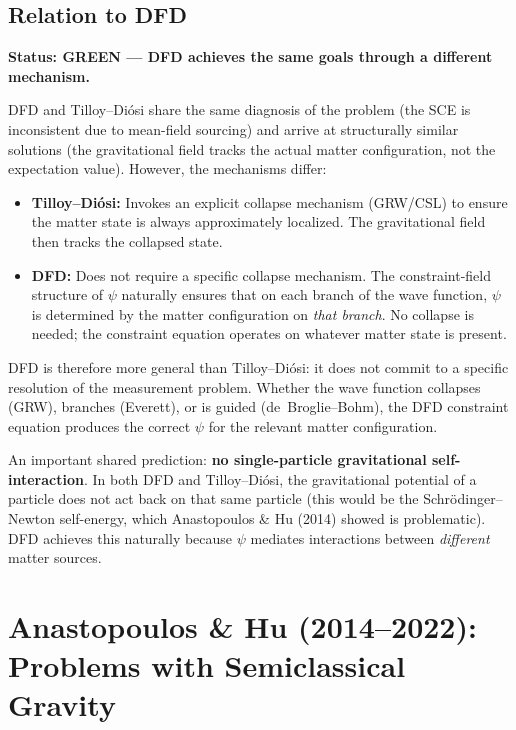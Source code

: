 \documentclass[12pt,a4paper]{article}
\newcommand{\GREEN}{\textcolor{dfdgreen}{\textbf{GREEN}}}
\begin{document}
\subsection{Relation to DFD}

\textbf{Status: \GREEN{} --- DFD achieves the same goals through a different mechanism.}

DFD and Tilloy--Di\'osi share the same diagnosis of the problem (the SCE is inconsistent due to mean-field sourcing) and arrive at structurally similar solutions (the gravitational field tracks the actual matter configuration, not the expectation value). However, the mechanisms differ:

\begin{itemize}
\item \textbf{Tilloy--Di\'osi:} Invokes an explicit collapse mechanism (GRW/CSL) to ensure the matter state is always approximately localized. The gravitational field then tracks the collapsed state.

\item \textbf{DFD:} Does not require a specific collapse mechanism. The constraint-field structure of $\psi$ naturally ensures that on each branch of the wave function, $\psi$ is determined by the matter configuration on \emph{that branch}. No collapse is needed; the constraint equation operates on whatever matter state is present.
\end{itemize}

DFD is therefore more general than Tilloy--Di\'osi: it does not commit to a specific resolution of the measurement problem. Whether the wave function collapses (GRW), branches (Everett), or is guided (de~Broglie--Bohm), the DFD constraint equation produces the correct $\psi$ for the relevant matter configuration.

An important shared prediction: \textbf{no single-particle gravitational self-interaction}. In both DFD and Tilloy--Di\'osi, the gravitational potential of a particle does not act back on that same particle (this would be the Schr\"odinger--Newton self-energy, which Anastopoulos \& Hu (2014) showed is problematic). DFD achieves this naturally because $\psi$ mediates interactions between \emph{different} matter sources.


\section{Anastopoulos \& Hu (2014--2022): Problems with Semiclassical Gravity}
\label{sec:anastopoulos-hu}
\end{document}

